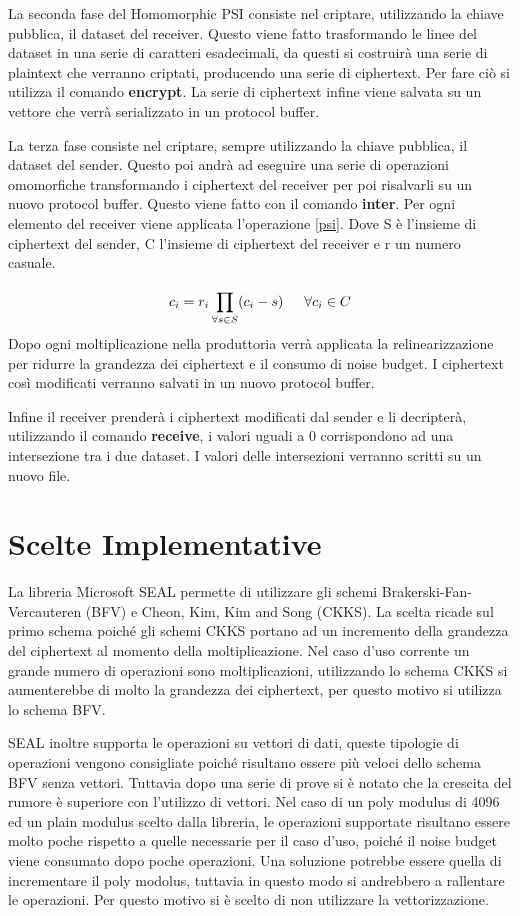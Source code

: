 \documentclass[]{article}
\begin{document}
La seconda fase del Homomorphic PSI consiste nel criptare, utilizzando la chiave pubblica, il dataset del receiver. Questo viene fatto trasformando le linee del dataset in una serie di caratteri esadecimali, da questi si costruirà una serie di plaintext che verranno criptati, producendo una serie di ciphertext.
Per fare ciò si utilizza il comando \textbf{encrypt}.
La serie di ciphertext infine viene salvata su un vettore che verrà serializzato in un protocol buffer.

La terza fase consiste nel criptare, sempre utilizzando la chiave pubblica, il dataset del sender. Questo poi andrà ad eseguire una serie di operazioni omomorfiche transformando i ciphertext del receiver per poi risalvarli su un nuovo protocol buffer. Questo viene fatto con il comando \textbf{inter}. Per ogni elemento del receiver viene applicata l'operazione \ref{psi}. Dove S è l'insieme di ciphertext del sender, C l'insieme di ciphertext del receiver e r un numero casuale. 

\begin{equation}\label{psi}
	c_{i} = r_i\prod_{\forall s \in S}^{}(c_i - s)	\indent	\forall c_{i} \in C
\end{equation}
Dopo ogni moltiplicazione nella produttoria verrà applicata la relinearizzazione per ridurre la grandezza dei ciphertext e il consumo di noise budget. I ciphertext così modificati verranno salvati in un nuovo protocol buffer.


Infine il receiver prenderà i ciphertext modificati dal sender e li decripterà, utilizzando il comando \textbf{receive}, i valori uguali a 0 corrispondono ad una intersezione tra i due dataset. I valori delle intersezioni verranno scritti su un nuovo file.

\section{Scelte Implementative}
La libreria Microsoft SEAL permette di utilizzare gli schemi Brakerski-Fan-Vercauteren  (BFV) e Cheon, Kim, Kim and Song (CKKS). La scelta ricade sul primo schema poiché gli schemi CKKS portano ad un incremento della grandezza del ciphertext al momento della moltiplicazione. Nel caso d'uso corrente un grande numero di operazioni sono moltiplicazioni, utilizzando lo schema CKKS si aumenterebbe di molto la grandezza dei ciphertext, per questo motivo si utilizza lo schema BFV.

SEAL inoltre supporta le operazioni su vettori di dati, queste tipologie di operazioni vengono consigliate poiché risultano essere più veloci dello schema BFV senza vettori. Tuttavia dopo una serie di prove si è notato che la crescita del rumore è superiore con l'utilizzo di vettori. Nel caso di un poly modulus di 4096 ed un plain modulus scelto dalla libreria, le operazioni supportate risultano essere molto poche rispetto a quelle necessarie per il caso d'uso, poiché il noise budget viene consumato dopo poche operazioni. Una soluzione potrebbe essere quella di incrementare il poly modolus, tuttavia in questo modo si andrebbero a rallentare le operazioni. Per questo motivo si è scelto di non utilizzare la vettorizzazione. 
\end{document}
